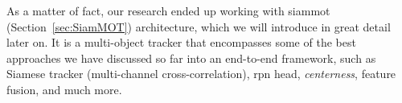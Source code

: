 As a matter of fact, our research ended up working with \gls{siammot}~\cite{shuai2021siammot} (Section~\ref{sec:SiamMOT}) architecture, which we will introduce in great detail later on. It is a multi-object tracker that encompasses some of the best approaches we have discussed so far into an end-to-end framework, such as Siamese tracker (multi-channel cross-correlation), \gls{rpn} head, \emph{centerness}, feature fusion, and much more.
